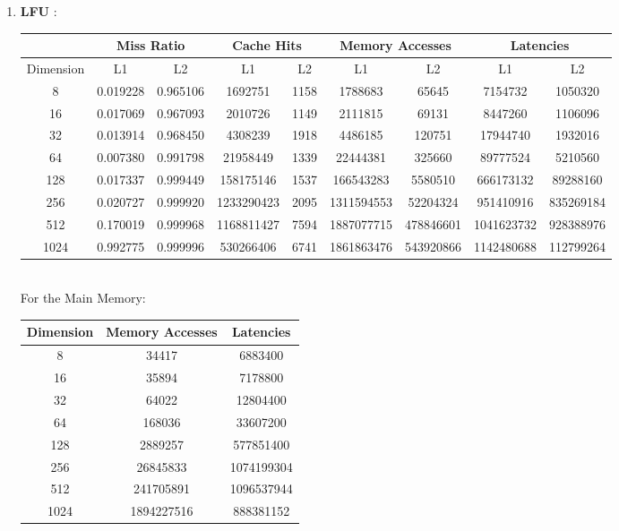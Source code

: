 \documentclass{article}
\begin{document}
\begin{enumerate}
\item \textbf{ LFU }:\\

\begin{tabular}{ |c|c|c|c|c|c|c|c|c| }
\hline
& \multicolumn{2}{|c|}{Miss Ratio} & \multicolumn{2}{|c|}{Cache Hits} & \multicolumn{2}{|c|}{Memory Accesses} & \multicolumn{2}{|c|}{Latencies} \\  \hline
Dimension & L1 & L2 & L1 & L2 & L1 & L2 & L1 & L2 \\  \hline
8  &  0.019228 & 0.965106 &  1692751 & 1158 &  1788683 & 65645 &  7154732 & 1050320 \\ \hline
16  &  0.017069 & 0.967093 &  2010726 & 1149 &  2111815 & 69131 &  8447260 & 1106096 \\ \hline
32  &  0.013914 & 0.968450 &  4308239 & 1918 &  4486185 & 120751 &  17944740 & 1932016 \\ \hline
64  &  0.007380 & 0.991798 &  21958449 & 1339 &  22444381 & 325660 &  89777524 & 5210560 \\ \hline
128  &  0.017337 & 0.999449 &  158175146 & 1537 &  166543283 & 5580510 &  666173132 & 89288160 \\ \hline
256  &  0.020727 & 0.999920 &  1233290423 & 2095 &  1311594553 & 52204324 &  951410916 & 835269184 \\ \hline
512  &  0.170019 & 0.999968 &  1168811427 & 7594 &  1887077715 & 478846601 &  1041623732 & 928388976 \\ \hline
1024  &  0.992775 & 0.999996 &  530266406 & 6741 &  1861863476 & 543920866 &  1142480688 & 112799264 \\ \hline
\end{tabular}\\

For the Main Memory:\\

\begin{tabular}{ |c|c|c| }
\hline
Dimension & Memory Accesses & Latencies \\  \hline
8 & 34417 & 6883400 \\ \hline
16 & 35894 & 7178800 \\ \hline
32 & 64022 & 12804400 \\ \hline
64 & 168036 & 33607200 \\ \hline
128 & 2889257 & 577851400 \\ \hline
256 & 26845833 & 1074199304 \\ \hline
512 & 241705891 & 1096537944 \\ \hline
1024 & 1894227516 & 888381152 \\ \hline
\end{tabular}\\\\


\end{enumerate}
\end{document}
